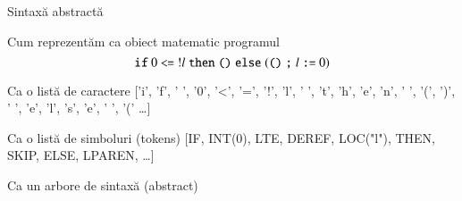 \documentclass[xcolor=pdftex,romanian,colorlinks]{beamer}
\begin{document}
\begin{section}{Sintaxă abstractă}

\begin{frame}
{Cum reprezentăm ca obiect matematic programul}
{\[\mathrel{\text{\ttfamily if}} 0 \mathrel{\text{\ttfamily <=}} {!l} \mathrel{\text{\ttfamily then}} {\mathrel{\text{\ttfamily ()}}} \mathrel{\text{\ttfamily else}} ({\mathrel{\text{\ttfamily ()}}} \mathrel{\text{\ttfamily ;}} {l \mathrel{\text{\ttfamily :=}} 0})\]} 

\begin{block}{Ca o listă de caractere}
['i', 'f', ' ', '0', '<', '=', '!', 'l', ' ', 't', 'h', 'e', 'n', ' ', '(', ')', ' ', 'e', 'l', 's', 'e', ' ', '(' \ldots]
\end{block}
\begin{block}{Ca o listă de simboluri (tokens)}
[IF, INT(0), LTE, DEREF, LOC("l"), THEN, SKIP, ELSE, LPAREN, \ldots]
\end{block} 
\begin{block}{Ca un arbore de sintaxă (abstract)}
\hfill
\begin{minipage}{.5\columnwidth}
\vspace{-3ex}
\end{minipage}
\end{block}
\end{frame}






\end{section}
\end{document}
